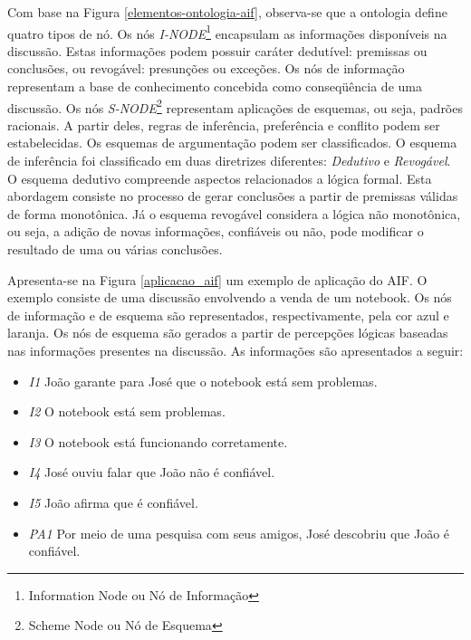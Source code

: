 Com base na Figura \ref{elementos-ontologia-aif}, observa-se que a ontologia define quatro tipos de nó. Os nós \textit{I-NODE}\footnote{Information Node ou Nó de Informação} encapsulam as informações disponíveis na discussão. Estas informações podem possuir caráter dedutível: premissas ou conclusões, ou revogável: presunções ou exceções. Os nós de informação representam a base de conhecimento concebida como conseqüência de uma discussão. Os nós \textit{S-NODE}\footnote{Scheme Node ou Nó de Esquema} representam aplicações de esquemas, ou seja, padrões racionais. A partir deles, regras de inferência, preferência e conflito podem ser estabelecidas. Os esquemas de argumentação podem ser classificados. O esquema de inferência foi classificado em duas diretrizes diferentes: \textit{Dedutivo} e \textit{Revogável}. O esquema dedutivo compreende aspectos relacionados a lógica formal. Esta abordagem consiste no processo de gerar conclusões a partir de premissas válidas de forma monotônica. Já o esquema revogável considera a lógica não monotônica, ou seja, a adição de novas informações, confiáveis ou não, pode modificar o resultado de uma ou várias conclusões. 

Apresenta-se na Figura \ref{aplicacao_aif} um exemplo de aplicação do AIF. O exemplo consiste de uma discussão envolvendo a venda de um notebook. Os nós de informação e de esquema são representados, respectivamente, pela cor azul e laranja. Os nós de esquema são gerados a partir de percepções lógicas baseadas nas informações presentes na discussão. As informações são apresentados a seguir:

\begin{itemize}

\item \textit{I1} João garante para José que o notebook está sem problemas.
\item \textit{I2} O notebook está sem problemas.
\item \textit{I3} O notebook está funcionando corretamente.
\item \textit{I4} José ouviu falar que João não é confiável.
\item \textit{I5} João afirma que é confiável.
\item \textit{PA1} Por meio de uma pesquisa com seus amigos, José descobriu que João é confiável.  

\end{itemize}

